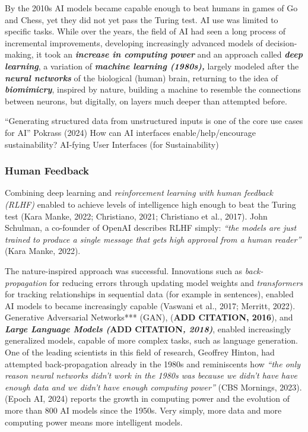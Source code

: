 \documentclass[
  letterpaper,
  DIV=11,
  numbers=noendperiod]{scrartcl}
\begin{document}
By the 2010s AI models became capable enough to beat humans in games of
Go and Chess, yet they did not yet pass the Turing test. AI use was
limited to specific tasks. While over the years, the field of AI had
seen a long process of incremental improvements, developing increasingly
advanced models of decision-making, it took an \textbf{\emph{increase in
computing power}} and an approach called \textbf{\emph{deep learning}},
a variation of \textbf{\emph{machine learning (1980s),}} largely modeled
after the \textbf{\emph{neural networks}} of the biological (human)
brain, returning to the idea of \textbf{\emph{biomimicry}}, inspired by
nature, building a machine to resemble the connections between neurons,
but digitally, on layers much deeper than attempted before.

``Generating structured data from unstructured inputs is one of the core
use cases for AI'' Pokrass (2024) How can AI interfaces
enable/help/encourage sustainability? AI-fying User Interfaces (for
Sustainability)

\subsubsection{\texorpdfstring{\textbf{Human
Feedback}}{Human Feedback}}\label{human-feedback}

Combining deep learning and \emph{reinforcement learning with human
feedback (RLHF)} enabled to achieve levels of intelligence high enough
to beat the Turing test (Kara Manke, 2022; Christiano, 2021; Christiano
et al., 2017). John Schulman, a co-founder of OpenAI describes RLHF
simply: \emph{``the models are just trained to produce a single message
that gets high approval from a human reader''} (Kara Manke, 2022).

The nature-inspired approach was successful. Innovations such as
\emph{back-propagation} for reducing errors through updating model
weights and \emph{transformers} for tracking relationships in sequential
data (for example in sentences), enabled AI models to became
increasingly capable (Vaswani et al., 2017; Merritt, 2022). Generative
Adversarial Networks*** (GAN), (\textbf{ADD CITATION, 2016}), and
\textbf{\emph{Large Language Models (}ADD CITATION\emph{, 2018)}},
enabled increasingly generalized models, capable of more complex tasks,
such as language generation. One of the leading scientists in this field
of research, Geoffrey Hinton, had attempted back-propagation already in
the 1980s and reminiscents how \emph{``the only reason neural networks
didn't work in the 1980s was because we didn't have have enough data and
we didn't have enough computing power''} (CBS Mornings, 2023). (Epoch
AI, 2024) reports the growth in computing power and the evolution of
more than 800 AI models since the 1950s. Very simply, more data and more
computing power means more intelligent models.
\end{document}
